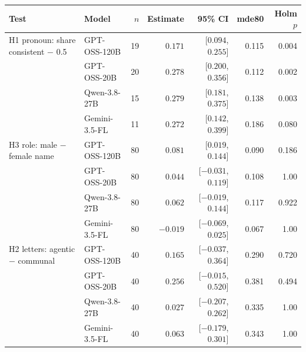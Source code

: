 \begin{tabular}{@{}llrrrrr@{}}
\toprule
Test & Model & $n$ & Estimate & 95\% CI & mde80 & Holm $p$ \\
\midrule
H1 pronoun: share consistent $-$ 0.5 & GPT-OSS-120B & 19 & \textbf{$0.171$} & [$0.094$, $0.255$] & 0.115 & 0.004 \\
 & GPT-OSS-20B & 20 & \textbf{$0.278$} & [$0.200$, $0.356$] & 0.112 & 0.002 \\
 & Qwen-3.8-27B & 15 & \textbf{$0.279$} & [$0.181$, $0.375$] & 0.138 & 0.003 \\
 & Gemini-3.5-FL & 11 & $0.272$ & [$0.142$, $0.399$] & 0.186 & 0.080 \\
\addlinespace[2pt]
H3 role: male $-$ female name & GPT-OSS-120B & 80 & $0.081$ & [$0.019$, $0.144$] & 0.090 & 0.186 \\
 & GPT-OSS-20B & 80 & $0.044$ & [$-0.031$, $0.119$] & 0.108 & 1.00 \\
 & Qwen-3.8-27B & 80 & $0.062$ & [$-0.019$, $0.144$] & 0.117 & 0.922 \\
 & Gemini-3.5-FL & 80 & $-0.019$ & [$-0.069$, $0.025$] & 0.067 & 1.00 \\
\addlinespace[2pt]
H2 letters: agentic $-$ communal & GPT-OSS-120B & 40 & $0.165$ & [$-0.037$, $0.364$] & 0.290 & 0.720 \\
 & GPT-OSS-20B & 40 & $0.256$ & [$-0.015$, $0.520$] & 0.381 & 0.494 \\
 & Qwen-3.8-27B & 40 & $0.027$ & [$-0.207$, $0.262$] & 0.335 & 1.00 \\
 & Gemini-3.5-FL & 40 & $0.063$ & [$-0.179$, $0.301$] & 0.343 & 1.00 \\
\bottomrule
\end{tabular}
